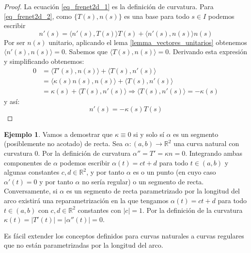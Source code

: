 \documentclass{article}
\theoremstyle{definition}
\newtheorem{ejem}{Ejemplo}
\newcommand{\reales}{\mathbb{R}}
\begin{document}
\begin{proof}
	La ecuación \eqref{eq_frenet2d_1} es la definición de curvatura. Para \eqref{eq_frenet2d_2}, como $\{T(s), n(s) \}$ es una base para todo $s \in I$ podemos escribir
	\begin{equation*}
		n'(s) = \langle n'(s), T(s) \rangle T(s) + \langle n'(s), n(s) \rangle n(s)
	\end{equation*}
	Por ser $n(s)$ unitario, aplicando el lema \eqref{lemma_vectores_unitarios} obtenemos $\langle n'(s), n(s) \rangle = 0$. Sabemos que $\langle T(s), n(s) \rangle = 0$. Derivando esta expresión y simplificando obtenemos:
	\begin{equation*}
	\begin{split}
		0 & = \langle T'(s), n(s) \rangle + \langle T(s), n'(s) \rangle \\ 
		& = \langle \kappa(s)n(s), n(s) \rangle + \langle T(s), n'(s) \rangle \\
		& = \kappa(s) + \langle T(s), n'(s) \rangle
		\Rightarrow \langle T(s), n'(s) \rangle = -\kappa(s)
	\end{split}
	\end{equation*}
	y así:
	\begin{equation*}
		n'(s) = -\kappa(s) T(s)
	\end{equation*}
\end{proof}

\begin{ejem}
	Vamos a demostrar que $\kappa \equiv 0$ si y solo sí $\alpha$ es un segmento (posiblemente no acotado) de recta. Sea $\alpha : (a, b) \rightarrow \reales^2$ una curva natural con curvatura $0$. Por la definición de curvatura $\alpha'' = T' = \kappa n = 0$. Integrando ambas componentes de $\alpha$ podemos escribir $\alpha(t) = ct + d$ para todo $t \in (a, b)$ y algunas constantes $c, d \in \reales^2$, y por tanto $\alpha$ es o un punto (en cuyo caso $\alpha'(t) = 0$ y por tanto $\alpha$ no sería regular) o un segmento de recta. Conversamente, si $\alpha$ es un segmento de recta parametrizado por la longitud del arco existirá una reparametrización en la que tengamos $\alpha(t) = ct + d$ para todo $t \in (a, b)$ con $c, d \in \reales^2$ constantes con $|c| = 1$. Por la definición de la curvatura $\kappa(t) = |T'(t)| = |\alpha''(t)| = 0$.
\end{ejem}

Es fácil extender los conceptos definidos para curvas naturales a curvas regulares que no están parametrizadas por la longitud del arco.
\end{document}
